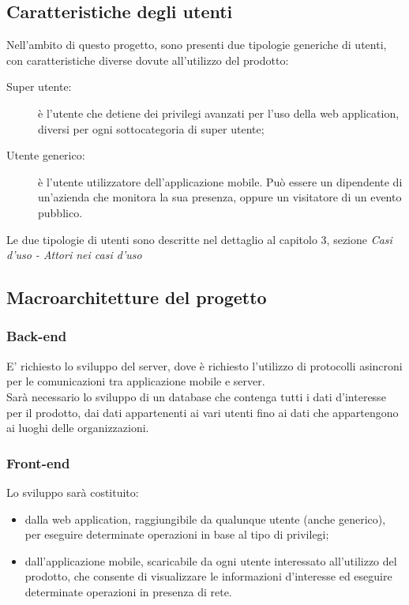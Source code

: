 \documentclass[../analisi-dei-requisiti]{subfiles}
\begin{document}
\subsection{Caratteristiche degli utenti}%
\label{sub:caratteristiche_degli_utenti}
Nell'ambito di questo progetto, sono presenti due tipologie generiche di utenti, con caratteristiche diverse dovute all'utilizzo del prodotto:
\begin{description}
  \item[Super utente:] è l'utente che detiene dei privilegi avanzati per l'uso della web application, diversi per ogni sottocategoria di super utente;
  \item[Utente generico:] è l'utente utilizzatore dell'applicazione mobile. Può essere un dipendente di un'azienda che monitora la sua presenza, oppure
  un visitatore di un evento pubblico.
\end{description}
Le due tipologie di utenti sono descritte nel dettaglio al capitolo 3, sezione \emph{Casi d'uso - Attori nei casi d'uso}

\subsection{Macroarchitetture del progetto}%
\label{sub:macroarchitetture_del_progetto}
\subsubsection{Back-end}%
\label{par:back-end}
E' richiesto lo sviluppo  del server, dove è richiesto l'utilizzo di protocolli asincroni per le comunicazioni tra applicazione mobile e server.\\
Sarà necessario lo sviluppo di un database che contenga tutti i dati d'interesse per il prodotto, dai dati appartenenti ai vari utenti fino ai dati che appartengono ai
luoghi delle organizzazioni.
\subsubsection{Front-end}%
\label{par:front-end}
Lo sviluppo  sarà costituito:
\begin{itemize}
  \item dalla web application, raggiungibile da qualunque utente (anche generico), per eseguire determinate operazioni in base al tipo di privilegi;
  \item dall'applicazione mobile, scaricabile da ogni utente interessato all'utilizzo del prodotto, che consente di visualizzare le informazioni d'interesse ed eseguire determinate
  operazioni in presenza di rete.
\end{itemize}
\end{document}
